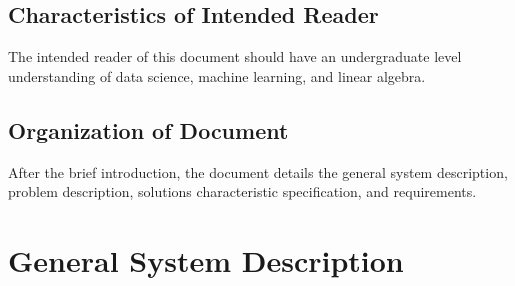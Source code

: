 \documentclass[12pt]{article}
\begin{document}
\subsection{Characteristics of Intended Reader} \label{sec_IntendedReader}

The intended reader of this document should have an undergraduate level
understanding of data science, machine learning, and linear algebra.



\subsection{Organization of Document}

After the brief introduction, the document details the general system
description, problem description, solutions characteristic specification, and
requirements.


\section{General System Description}
\end{document}
